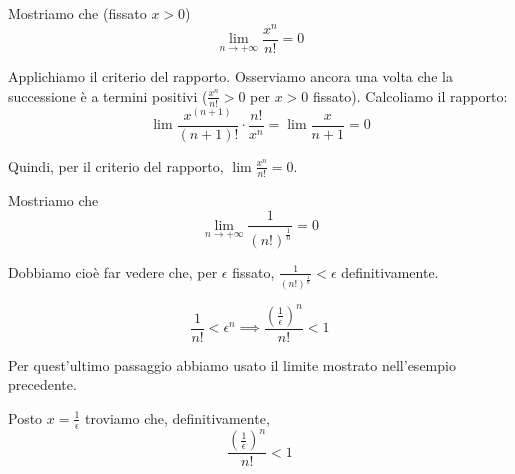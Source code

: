 \begin{example}
Mostriamo che (fissato $x > 0$)
\begin{equation*}
\lim_{n \to +\infty} \frac{x^n}{n!} = 0
\end{equation*}

Applichiamo il criterio del rapporto. Osserviamo ancora una volta che la successione è a termini positivi ($\frac{x^n}{n!} > 0$ per $x > 0$ fissato). Calcoliamo il rapporto:
\begin{equation*}
\lim \frac{x^{(n+1)}}{(n+1)!} \cdot \frac{n!}{x^n} = \lim \frac{x}{n + 1} = 0
\end{equation*}

Quindi, per il criterio del rapporto, $\lim \frac{x^n}{n!} = 0$.
\end{example}

\begin{example}
Mostriamo che 
\begin{equation*}
\lim_{n \to +\infty} \frac{1}{(n!)^\frac{1}{n}} = 0
\end{equation*}

Dobbiamo cioè far vedere che, per $\epsilon$ fissato, $\frac{1}{(n!)^\frac{1}{n}} < \epsilon$ definitivamente.

\begin{equation*}
\frac{1}{n!} < \epsilon^n \implies \frac{(\frac{1}{\epsilon})^n}{n!} < 1
\end{equation*}

Per quest'ultimo passaggio abbiamo usato il limite mostrato nell'esempio precedente.

Posto $x = \frac{1}{\epsilon}$ troviamo che, definitivamente, 
\begin{equation*}
\frac{(\frac{1}{\epsilon})^n}{n!} < 1
\end{equation*}
\end{example}

